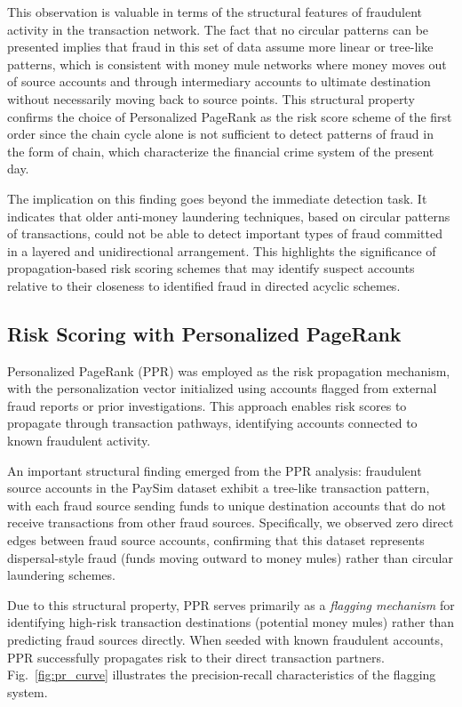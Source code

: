 \documentclass[lettersize,journal]{IEEEtran}
\begin{document}
This observation is valuable in terms of the structural features of fraudulent activity in the transaction network. The fact that no circular patterns can be presented implies that fraud in this set of data assume more linear or tree-like patterns, which is consistent with money mule networks where money moves out of source accounts and through intermediary accounts to ultimate destination without necessarily moving back to source points. This structural property confirms the choice of Personalized PageRank as the risk score scheme of the first order since the chain cycle alone is not sufficient to detect patterns of fraud in the form of chain, which characterize the financial crime system of the present day.

The implication on this finding goes beyond the immediate detection task. It indicates that older anti-money laundering techniques, based on circular patterns of transactions, could not be able to detect important types of fraud committed in a layered and unidirectional arrangement. This highlights the significance of propagation-based risk scoring schemes that may identify suspect accounts relative to their closeness to identified fraud in directed acyclic schemes.

\subsection{Risk Scoring with Personalized PageRank}
Personalized PageRank (PPR) was employed as the risk propagation mechanism, with the personalization vector initialized using accounts flagged from external fraud reports or prior investigations. This approach enables risk scores to propagate through transaction pathways, identifying accounts connected to known fraudulent activity.

An important structural finding emerged from the PPR analysis: fraudulent source accounts in the PaySim dataset exhibit a tree-like transaction pattern, with each fraud source sending funds to unique destination accounts that do not receive transactions from other fraud sources. Specifically, we observed zero direct edges between fraud source accounts, confirming that this dataset represents dispersal-style fraud (funds moving outward to money mules) rather than circular laundering schemes.

Due to this structural property, PPR serves primarily as a \textit{flagging mechanism} for identifying high-risk transaction destinations (potential money mules) rather than predicting fraud sources directly. When seeded with known fraudulent accounts, PPR successfully propagates risk to their direct transaction partners. Fig.~\ref{fig:pr_curve} illustrates the precision-recall characteristics of the flagging system.
\end{document}
